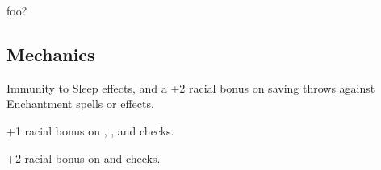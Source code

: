 
foo?

\subsection{Mechanics}

\begin{itemize*}
\item {}
\item {}
\item {}
\item {}
\item Immunity to Sleep effects, and a +2 racial bonus on saving throws against Enchantment spells or effects.
\item +1 racial bonus on , , and  checks.
\item +2 racial bonus on  and  checks.
\item {}
\item {}
\item {}
\end{itemize*}
